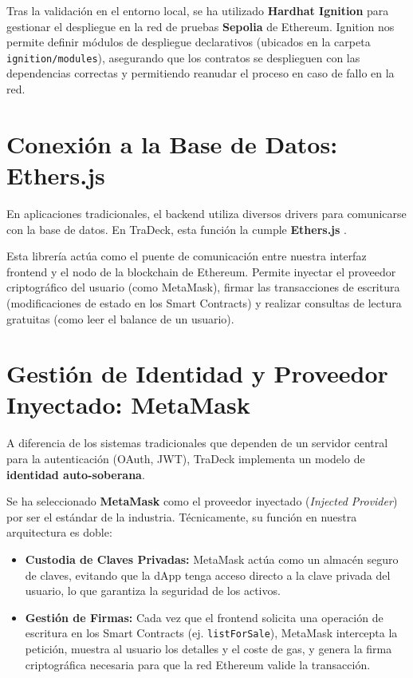 Tras la validación en el entorno local, se ha utilizado \textbf{Hardhat Ignition} para gestionar 
el despliegue en la red de pruebas \textbf{Sepolia} de Ethereum. Ignition nos permite definir módulos 
de despliegue declarativos (ubicados en la carpeta \texttt{ignition/modules}), asegurando que los 
contratos se desplieguen con las dependencias correctas y permitiendo reanudar el proceso en caso 
de fallo en la red.

\section{Conexión a la Base de Datos: Ethers.js}
En aplicaciones tradicionales, el backend utiliza diversos drivers para comunicarse con la base de datos. 
En TraDeck, esta función la cumple \textbf{Ethers.js} \cite{ethers_docs}. 

Esta librería actúa como el puente de comunicación entre nuestra interfaz frontend y el nodo de la blockchain 
de Ethereum. Permite inyectar el proveedor criptográfico del usuario (como MetaMask), firmar las transacciones 
de escritura (modificaciones de estado en los Smart Contracts) y realizar consultas de lectura 
gratuitas (como leer el balance de un usuario).

\section{Gestión de Identidad y Proveedor Inyectado: MetaMask}
A diferencia de los sistemas tradicionales que dependen de un servidor central para la autenticación (OAuth, JWT), 
TraDeck implementa un modelo de \textbf{identidad auto-soberana}. 

Se ha seleccionado \textbf{MetaMask} \cite{metamask_docs} como el proveedor inyectado (\textit{Injected Provider}) 
por ser el estándar de la industria. Técnicamente, su función en nuestra arquitectura es doble:
\begin{itemize}
	\item \textbf{Custodia de Claves Privadas:} MetaMask actúa como un almacén seguro de claves, evitando que la 
	dApp tenga acceso directo a la clave privada del usuario, lo que garantiza la seguridad de los activos.
	\item \textbf{Gestión de Firmas:} Cada vez que el frontend solicita una operación de escritura en los Smart 
	Contracts (ej. \texttt{listForSale}), MetaMask intercepta la petición, muestra al usuario los detalles y el 
	coste de gas, y genera la firma criptográfica necesaria para que la red Ethereum valide la transacción.
\end{itemize}

